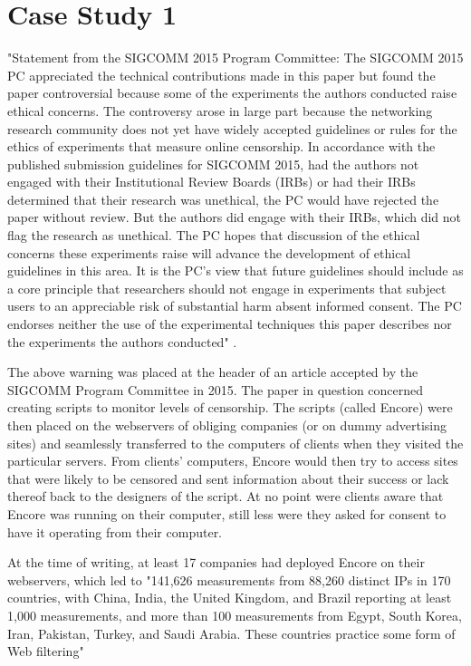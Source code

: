 \documentclass{svjour3}                     %
\begin{document}
\section{Case Study 1}
\label{sec:case1}
"Statement from the SIGCOMM 2015 Program Committee: The SIGCOMM 2015 PC appreciated the technical contributions made in this paper but found the paper controversial because some of the experiments the authors conducted raise ethical concerns. The controversy arose in large part because the networking research community does not yet have widely accepted guidelines or rules for the ethics of experiments that measure online censorship. In accordance with the published submission guidelines for SIGCOMM 2015, had the authors not engaged with their Institutional Review Boards (IRBs) or had their IRBs determined that their research was unethical, the PC would have rejected the paper without review. But the authors did engage with their IRBs, which did not flag the research as unethical. The PC hopes that discussion of the ethical concerns these experiments raise will advance the development of ethical guidelines in this area. It is the PC’s view that future guidelines should include as a core principle that researchers should not engage in experiments that subject users to an appreciable risk of substantial harm absent informed consent. The PC endorses neither the use of the experimental techniques this paper describes nor the experiments the authors conducted" \cite{burnett2015encore}.

The above warning was placed at the header of an article accepted by the SIGCOMM Program Committee in 2015.  The paper in question concerned creating scripts to monitor levels of censorship.  The scripts (called Encore) were then placed on the webservers of obliging companies (or on dummy advertising sites) and seamlessly transferred to the computers of clients when they visited the particular servers.  From clients' computers, Encore would then try to access sites that were likely to be censored and sent information about their success or lack thereof back to the designers of the script.  At no point were clients aware that Encore was running on their computer, still less were they asked for consent to have it operating from their computer.  

At the time of writing, at least 17 companies had deployed Encore on their webservers, which led to "141,626 measurements from 88,260 distinct IPs in 170 countries, with China, India, the United Kingdom, and Brazil reporting at least 1,000 measurements, and more than 100 measurements from Egypt, South Korea, Iran, Pakistan, Turkey, and Saudi Arabia. These countries practice some form of Web filtering" \cite[p.~662] {burnett2015encore}
\end{document}
